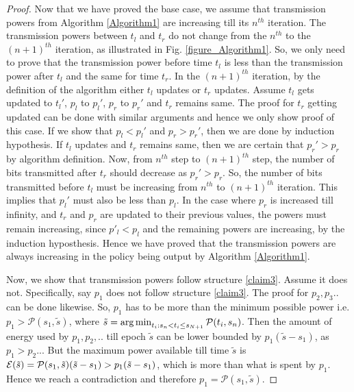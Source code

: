 \begin{proof}
Now that we have proved the base case, we assume that transmission powers from Algorithm \ref{Algorithm1} are increasing till its $n^{th}$ iteration. The transmission powers between $t_l$ and $t_r$ do not change from the $n^{th}$ to the $(n+1)^{th}$ iteration, as illustrated in Fig. \ref{figure_Algorithm1}. So, we only need to prove that the transmission power before time $t_l$ is less than the transmission power after $t_l$ and the same for time $t_r$. In the $(n+1)^{th}$ iteration, by the definition of the algorithm either $t_l$ updates or $t_{r}$ updates. Assume $t_l$ gets updated to $t_{l}'$, $p_l$ to $p_l'$, $p_r$ to $p_r'$ and $t_r$ remains same. The proof for $t_r$ getting updated can be done with similar arguments and hence we only show proof of this case. If we show that $p_l<p_l'$ and $p_r>p_r'$, then we are done by induction hypothesis. If $t_l$ updates and $t_r$ remains same, then we are certain that $p_{r}'>p_r$ by algorithm definition. Now, from $n^{th}$ step to $(n+1)^{th}$ step, the number of bits transmitted after $t_r$ should decrease as $p_{r}'>p_r$. So, the number of bits transmitted before $t_l$ must be increasing from $n^{th}$ to $(n+1)^{th}$ iteration. This implies that $p_l'$ must also be less than $p_l$. In the case where $p_r$ is increased till infinity, and $t_r$ and $p_r$ are updated to their previous values, the powers must remain increasing, since $p'_l <p_l$ and the remaining powers are increasing, by the induction hyposthesis. Hence we have proved that the transmission powers are always increasing in the policy being output by Algorithm \ref{Algorithm1}.

Now, we show that transmission powers follow structure \eqref{claim3}. Assume it does not. Specifically, say $p_1$ does not follow structure \eqref{claim3}. The proof for $p_2,p_3..$ can be done likewise. So, $p_1$ has to be more than the minimum possible power i.e. $p_1>\mathcal{P}(s_1,\tilde{s})$, where $\tilde{s}=\operatorname*{arg\,min}_{t_i: s_n < t_i \le s_{N+1}} \mathcal{P}(t_i,s_n)$. Then the amount of energy used by $p_1,p_2,..$ till epoch $\tilde{s}$ can be lower bounded by $p_1(\tilde{s}-s_1)$, as $p_1>p_2..$. But the maximum power available till time $\tilde{s}$ is $\mathcal{E}(\tilde{s})=\mathcal{P}(s_1,\tilde{s})(\tilde{s}-s_1)>p_1(\tilde{s}-s_1)$, which is more than what is spent by $p_1$. Hence we reach a contradiction and therefore $p_1=\mathcal{P}(s_1,\tilde{s})$.


\end{proof}

